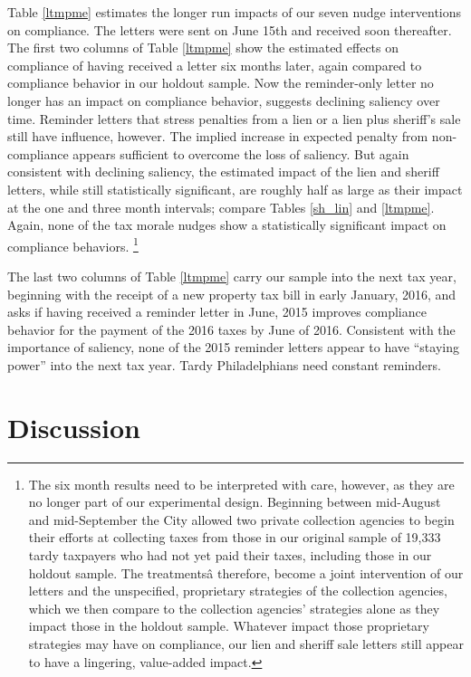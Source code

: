 \documentclass[12pt]{article}
\begin{document}
Table \ref{ltmpme} estimates the longer run impacts of our seven nudge
interventions on compliance.  The letters were sent on June 15th and
received soon thereafter.  The first two columns of Table \ref{ltmpme}
show the estimated effects on compliance of having received a letter
six months later, again compared to compliance behavior in our holdout
sample.  Now the reminder-only letter no longer has an impact on
compliance behavior, suggests declining saliency over time.  Reminder
letters that stress penalties from a lien or a lien plus sheriff's
sale still have influence, however.  The implied increase in expected
penalty from non-compliance appears sufficient to overcome the loss of
saliency.  But again consistent with declining saliency, the estimated
impact of the lien and sheriff letters, while still statistically
significant, are roughly half as large as their impact at the one and
three month intervals; compare Tables \ref{sh_lin} and \ref{ltmpme}.
Again, none of the tax morale nudges show a statistically significant
impact on compliance behaviors. \footnote{The six month results need
  to be interpreted with care, however, as they are no longer part of
  our experimental design.  Beginning between mid-August and
  mid-September the City allowed two private collection agencies to
  begin their efforts at collecting taxes from those in our original
  sample of 19,333 tardy taxpayers who had not yet paid their taxes,
  including those in our holdout sample.  The treatmentsâ therefore,
  become a joint intervention of our letters and the unspecified,
  proprietary strategies of the collection agencies, which we then
  compare to the collection agencies' strategies alone as they impact
  those in the holdout sample.  Whatever impact those proprietary
  strategies may have on compliance, our lien and sheriff sale letters
  still appear to have a lingering, value-added impact.}

The last two columns of Table \ref{ltmpme} carry our sample into the
next tax year, beginning with the receipt of a new property tax bill
in early January, 2016, and asks if having received a reminder letter
in June, 2015 improves compliance behavior for the payment of the 2016
taxes by June of 2016.  Consistent with the importance of saliency,
none of the 2015 reminder letters appear to have ``staying power'' into
the next tax year.  Tardy Philadelphians need constant reminders.

\section{Discussion}
\end{document}
